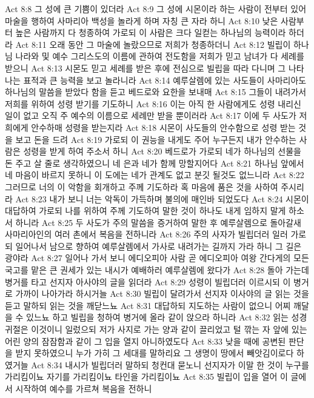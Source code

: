 Act 8:8  그 성에 큰 기쁨이 있더라
Act 8:9  그 성에 시몬이라 하는 사람이 전부터 있어 마술을 행하여 사마리아 백성을 놀라게 하며 자칭 큰 자라 하니
Act 8:10  낮은 사람부터 높은 사람까지 다 청종하여 가로되 이 사람은 크다 일컫는 하나님의 능력이라 하더라
Act 8:11  오래 동안 그 마술에 놀랐으므로 저희가 청종하더니
Act 8:12  빌립이 하나님 나라와 및 예수 그리스도의 이름에 관하여 전도함을 저희가 믿고 남녀가 다 세례를 받으니
Act 8:13  시몬도 믿고 세례를 받은 후에 전심으로 빌립을 따라 다니며 그 나타나는 표적과 큰 능력을 보고 놀라니라
Act 8:14  예루살렘에 있는 사도들이 사마리아도 하나님의 말씀을 받았다 함을 듣고 베드로와 요한을 보내매
Act 8:15  그들이 내려가서 저희를 위하여 성령 받기를 기도하니
Act 8:16  이는 아직 한 사람에게도 성령 내리신 일이 없고 오직 주 예수의 이름으로 세례만 받을 뿐이러라
Act 8:17  이에 두 사도가 저희에게 안수하매 성령을 받는지라
Act 8:18  시몬이 사도들의 안수함으로 성령 받는 것을 보고 돈을 드려
Act 8:19  가로되 이 권능을 내게도 주어 누구든지 내가 안수하는 사람은 성령을 받게 하여 주소서 하니
Act 8:20  베드로가 가로되 네가 하나님의 선물을 돈 주고 살 줄로 생각하였으니 네 은과 네가 함께 망할지어다
Act 8:21  하나님 앞에서 네 마음이 바르지 못하니 이 도에는 네가 관계도 없고 분깃 될것도 없느니라
Act 8:22  그러므로 너의 이 악함을 회개하고 주께 기도하라 혹 마음에 품은 것을 사하여 주시리라
Act 8:23  내가 보니 너는 악독이 가득하며 불의에 매인바 되었도다
Act 8:24  시몬이 대답하여 가로되 나를 위하여 주께 기도하여 말한 것이 하나도 내게 임하지 말게 하소서 하니라
Act 8:25  두 사도가 주의 말씀을 증거하여 말한 후 예루살렘으로 돌아갈새 사마리아인의 여러 촌에서 복음을 전하니라
Act 8:26  주의 사자가 빌립더러 일러 가로되 일어나서 남으로 향하여 예루살렘에서 가사로 내려가는 길까지 가라 하니 그 길은 광야라
Act 8:27  일어나 가서 보니 에디오피아 사람 곧 에디오피아 여왕 간다게의 모든 국고를 맡은 큰 권세가 있는 내시가 예배하러 예루살렘에 왔다가
Act 8:28  돌아 가는데 병거를 타고 선지자 아사야의 글을 읽더라
Act 8:29  성령이 빌립더러 이르시되 이 병거로 가까이 나아가라 하시거늘
Act 8:30  빌립이 달려가서 선지자 이사야의 글 읽는 것을 듣고 말하되 읽는 것을 깨닫느뇨
Act 8:31  대답하되 지도하는 사람이 없으니 어찌 깨달을 수 있느뇨 하고 빌립을 청하여 병거에 올라 같이 앉으라 하니라
Act 8:32  읽는 성경 귀절은 이것이니 일렀으되 저가 사지로 가는 양과 같이 끌리었고 털 깎는 자 앞에 있는 어린 양의 잠잠함과 같이 그 입을 열지 아니하였도다
Act 8:33  낮을 때에 공변된 판단을 받지 못하였으니 누가 가히 그 세대를 말하리요 그 생명이 땅에서 빼앗김이로다 하였거늘
Act 8:34  내시가 빌립더러 말하되 청컨대 묻노니 선지자가 이말 한 것이 누구를 가리킴이뇨 자기를 가리킴이뇨 타인을 가리킴이뇨
Act 8:35  빌립이 입을 열어 이 글에서 시작하여 예수를 가르쳐 복음을 전하니

